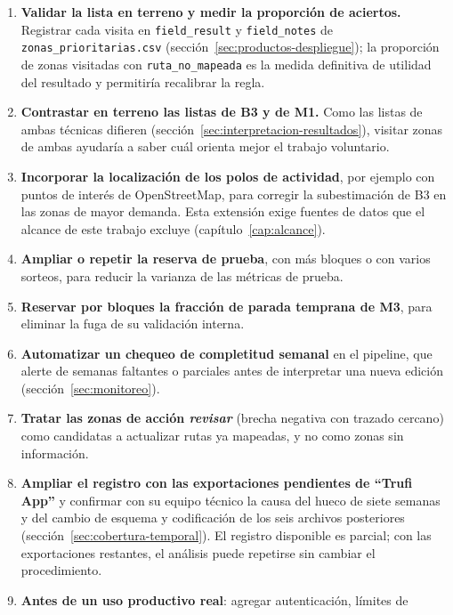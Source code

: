 \begin{enumerate}
  \item [R1.] \textbf{Validar la lista en terreno y medir la proporción de aciertos.}
        Registrar cada visita en \texttt{field\_result} y \texttt{field\_notes} de
        \texttt{zonas\_prioritarias.csv} (sección~\ref{sec:productos-despliegue}); la
        proporción de zonas visitadas con \texttt{ruta\_no\_mapeada} es la medida
        definitiva de utilidad del resultado y permitiría recalibrar la regla.
  \item [R2.] \textbf{Contrastar en terreno las listas de B3 y de M1.} Como las listas de
        ambas técnicas difieren (sección~\ref{sec:interpretacion-resultados}), visitar
        zonas de ambas ayudaría a saber cuál orienta mejor el trabajo voluntario.
  \item [R3.] \textbf{Incorporar la localización de los polos de actividad}, por ejemplo con
        puntos de interés de OpenStreetMap, para corregir la subestimación de B3 en las
        zonas de mayor demanda. Esta extensión exige fuentes de datos que el alcance de este
        trabajo excluye (capítulo~\ref{cap:alcance}).
  \item [R4.] \textbf{Ampliar o repetir la reserva de prueba}, con más bloques o con varios
        sorteos, para reducir la varianza de las métricas de prueba.
  \item [R5.] \textbf{Reservar por bloques la fracción de parada temprana de M3}, para
        eliminar la fuga de su validación interna.
  \item [R6.] \textbf{Automatizar un chequeo de completitud semanal} en el pipeline, que
        alerte de semanas faltantes o parciales antes de interpretar una nueva edición
        (sección~\ref{sec:monitoreo}).
  \item [R7.] \textbf{Tratar las zonas de acción \emph{revisar}} (brecha negativa con
        trazado cercano) como candidatas a actualizar rutas ya mapeadas, y no como zonas
        sin información.
  \item [R8.] \textbf{Ampliar el registro con las exportaciones pendientes de ``Trufi App''} y
        confirmar con su equipo técnico la causa del hueco de siete semanas y del cambio de
        esquema y codificación de los seis archivos posteriores
        (sección~\ref{sec:cobertura-temporal}). El registro disponible es parcial; con las
        exportaciones restantes, el análisis puede repetirse sin cambiar el procedimiento.
  \item [R9.] \textbf{Antes de un uso productivo real}: agregar autenticación, límites de

\end{enumerate}
